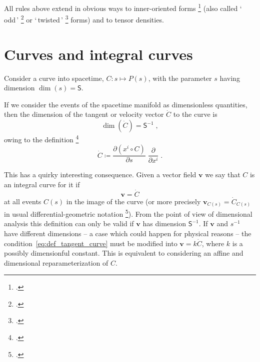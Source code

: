 \documentclass[\ifafour a4paper,12pt,\else a5paper,10pt,\fi%
onecolumn,oneside,article,%
british%
]{memoir}
\newcommand*{\defquote}[1]{`\,#1\,'}
\theoremstyle{remark}
\theoremstyle{innote}
\newcommand*{\citep}{\footcites}
\newcommand*{\de}{\partialup}%
\newcommand*{\defd}{\coloneqq}
\renewcommand*{\|}[1][]{\nonscript\,#1\vert\nonscript\;\mathopen{}}
\newcommand*{\sect}{\S}%
\newcommand*{\chap}{ch.}%
\newcommand*{\Ss}{\textsf{S}}
\newcommand*{\yv}{\bm{v}}
\newcommand*{\dex}[1][i]{\frac{\de}{\de x^{#1}}}
\begin{document}
All rules above extend in obvious ways to inner-oriented forms
\citep[\chap~II]{schouten1951_r1989} (also called \defquote{odd}
\citep[\chap~II]{derham1955_t1984} or \defquote{twisted}
\citep{burke1983,burke1995}[\chap~3]{bossavit1991} forms) and to tensor densities.


\section{Curves and integral curves}
\label{sec:curves}


Consider a curve into spacetime, $C\colon s \mapsto P(s)$, with the
parameter $s$ having dimension $\dim(s)=\Ss$.


If we consider the events of the spacetime manifold as dimensionless
quantities, then the dimension of the tangent or velocity vector $\dot{C}$
to the curve is
\begin{equation}
  \label{eq:dim_velocity}
  \dim(\dot{C}) = \Ss^{-1} \;,
\end{equation}
owing to the definition
\citep[\sect~III.B.1]{choquetbruhatetal1977_r1996}[\sect~IV.(1.9)]{boothby1975_r2003}
\begin{equation}
  \label{eq:def_tangent_curve}
\dot{C} \defd \frac{\de (x^{i} \circ C)}{\de s}\;\dex \;.
\end{equation}

This has a quirky  interesting consequence. Given a vector field $\yv$
we say that $C$ is an integral curve for it if
\begin{equation}
  \yv = \dot{C}
  \label{eq:integral_curve}
\end{equation}
at all events $C(s)$ in the image of the curve (or more precisely
$\yv_{C(s)} = \dot{C}_{C(s)}$ in usual differential-geometric notation
\citep[\sect~III.B.1]{choquetbruhatetal1977_r1996}). From the point of view
of dimensional analysis this definition can only be valid if $\yv$ has
dimension $\Ss^{-1}$. If $\yv$ and $s^{-1}$ have different dimensions -- a
case which could happen for physical reasons -- the
condition~\eqref{eq:def_tangent_curve} must be modified into
$\yv = k\dot{C}$, where $k$ is a possibly dimensionful constant. This is
equivalent to considering an affine and dimensional reparameterization of
$C$.

\end{document}
